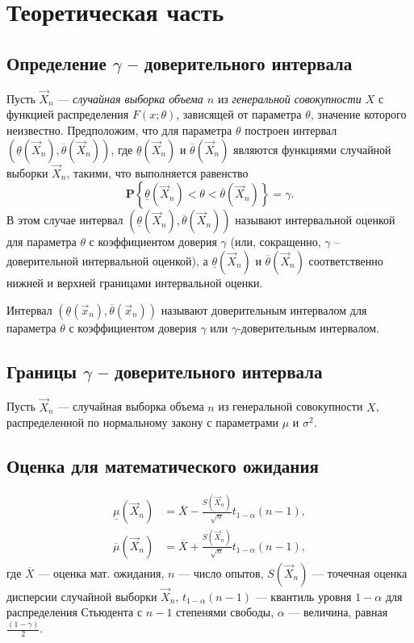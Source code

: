 \pagebreak

\chapter{Теоретическая часть}
\section{Определение $\gamma$ -- доверительного интервала}

Пусть $\vec X_n$ — \textit{случайная выборка объема $n$} из \textit{генеральной совокупности $X$} с функцией распределения $F(x;\theta)$, зависящей от параметра $\theta$, значение которого неизвестно.
Предположим, что для параметра $\theta$ построен интервал $\left(\underline\theta(\vec X_n), \overline\theta(\vec X_n)\right)$, где $\underline\theta(\vec X_n)$ и $\overline\theta(\vec X_n)$ являются функциями случайной выборки $\vec X_n$, такими, что выполняется равенство
\begin{equation}
	\mathbf P \left\{ \underline\theta(\vec X_n) < \theta < \overline\theta(\vec X_n) \right\} = \gamma.
\end{equation}
В этом случае интервал $\left(\underline\theta(\vec X_n), \overline\theta(\vec X_n)\right)$ называют интервальной оценкой для параметра $\theta$ с коэффициентом доверия $\gamma$ (или, сокращенно, $\gamma$ -- доверительной интервальной оценкой), а $\underline\theta(\vec X_n)$ и $\overline\theta(\vec X_n)$ соответственно нижней и верхней границами интервальной оценки.

Интервал $\left(\underline\theta(\vec x_n), \overline\theta(\vec x_n)\right)$ называют доверительным интервалом для параметра $\theta$ с коэффициентом доверия $\gamma$ или $\gamma$-доверительным интервалом.

\section{Границы $\gamma$ -- доверительного интервала}

Пусть $\vec X_n$ — случайная выборка объема $n$ из генеральной совокупности $X$, распределенной по нормальному закону с параметрами $\mu$ и $\sigma^{2}$.

\section{Оценка для математического ожидания}

\begin{align}
	\underline\mu(\vec X_n) &= \overline X -\frac{S(\vec X_n)}{\sqrt n}t_{1-\alpha}(n-1),\\
	\overline\mu(\vec X_n)  &= \overline X +\frac{S(\vec X_n)}{\sqrt n}t_{1-\alpha}(n-1),
\end{align}
где $\overline X$ — оценка мат. ожидания, $n$ — число опытов, $S(\vec X_n)$ — точечная оценка дисперсии случайной выборки $\vec X_n$, $t_{1-\alpha}(n-1)$ — квантиль уровня $1-\alpha$ для распределения Стьюдента с $n-1$ степенями свободы, $\alpha$ — величина, равная $\displaystyle \frac{(1-\gamma)}2$.

